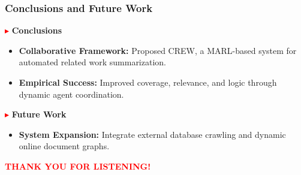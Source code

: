 \begin{frame}[t]
\vspace{-2mm}
\frametitle{Conclusions and Future Work}
\footnotesize

\vspace{0.4cm}
\textcolor{red}{\small$\blacktriangleright$} \textbf{Conclusions}
\begin{itemize}[leftmargin=2em, itemsep=0.3cm, topsep=0.1cm, label=\textcolor{blue!70!black}{\tiny$\bullet$}]
    \item \textbf{Collaborative Framework:} Proposed CREW, a MARL-based system for automated related work summarization.
    \item \textbf{Empirical Success:} Improved coverage, relevance, and logic through dynamic agent coordination.
\end{itemize}

\vspace{0.5cm}
\textcolor{red}{\small$\blacktriangleright$} \textbf{Future Work}
\begin{itemize}[leftmargin=2em, itemsep=0.3cm, topsep=0.1cm, label=\textcolor{blue!70!black}{\tiny$\bullet$}]
    \item \textbf{System Expansion:} Integrate external database crawling and dynamic online document graphs.
\end{itemize}

\vfill
\centering
\textcolor{red}{\Large\textbf{THANK YOU FOR LISTENING!}}
\vspace{4mm}

\end{frame}